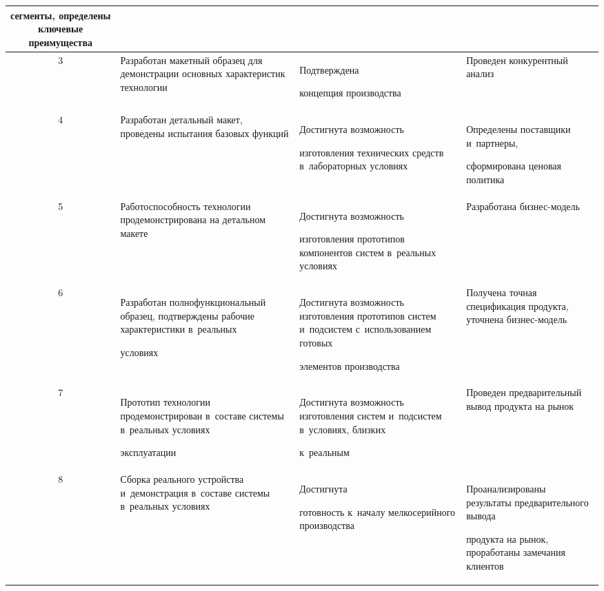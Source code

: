 \begin{table}
\begin{center}
\begin{tabular}{|c|p{40mm}|p{38mm}|p{35mm}|}
сегменты, определены ключевые преимущества\\

\hline

3&Разработан макетный образец для демонстрации основных характеристик технологии&Подтверждена 

концепция производства &Проведен конкурентный анализ\\

\hline

4&Разработан детальный макет, проведены испытания базовых функций&Достигнута возможность 

изготовления технических средств в~лабораторных условиях&Определены поставщики и~партнеры, 

сформирована ценовая политика \\

\hline

5&Работоспособность технологии продемонстрирована на детальном макете&Достигнута возможность 

изготовления прототипов компонентов систем в~реальных условиях&Разработана бизнес-мо\-дель\\

\hline

6&Разработан полнофункциональный образец, подтверждены рабочие характеристики в~реальных 

условиях&Достигнута возможность изготовления прототипов систем и~подсистем с~использованием готовых 

элементов производства &Получена точная спецификация продукта, уточнена бизнес-мо\-дель\\

\hline

7&Прототип технологии продемонстрирован в~составе системы в~реальных условиях 

эксплуатации&Достигнута возможность изготовления систем и~подсистем в~условиях, близких 

к~реальным&Проведен предварительный вывод продукта на рынок\\

\hline

8&Сборка реального устройства и~демонстрация в~составе системы в~реальных условиях&Достигнута 

готовность к~началу мелкосерийного производства&Проанализированы результаты предварительного вывода 

продукта на рынок, проработаны замечания клиентов\\


\end{tabular}
\end{center}
\end{table}
